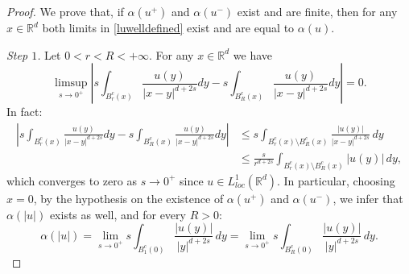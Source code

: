 \documentclass[10pt,a4paper]{amsart}
\def\R{\mathbb{R}}
\newcommand{\abs}[1]{\left|#1\right|}
\begin{document}
\begin{proof}
    We prove that, if $\alpha(u^+)$ and $\alpha(u^-)$ exist and are finite, then for any $x\in\R^d$ both limits in \ref{luwelldefined} exist and are equal to $\alpha(u)$.\par
    \textit{Step $1$.} Let $0<r<R<+\infty$. For any $x\in \R^d$ we have
    \begin{equation*}
        \limsup_{s\to 0^+} \left|s\int_{B_r^c(x)}\frac{u(y)}{\abs{x-y}^{d+2s}}dy-s\int_{B_R^c(x)}\frac{u(y)}{\abs{x-y}^{d+2s}}dy\right|=0.
    \end{equation*}
    In fact:
    \begin{equation*}
        \begin{split}
            \left|s\int_{B_r^c(x)}\frac{u(y)}{\abs{x-y}^{d+2s}}dy-s\int_{B_R^c(x)}\frac{u(y)}{\abs{x-y}^{d+2s}}dy\right|&\leq s\int_{B_r^c(x)\setminus B_R^c(x)}\frac{\abs{u(y)}}{\abs{x-y}^{d+2s}}\,dy\\
            &\leq \frac{s}{r^{d+2s}}\int_{B_r^c(x)\setminus B_R^c(x)}\abs{u(y)}\,dy,
        \end{split}
    \end{equation*}
    which converges to zero as $s\to0^+$ since $u\in L^1_{loc}(\R^d)$. In particular, choosing $x=0$, by the hypothesis on the existence of $\alpha(u^+)$ and $\alpha(u^-)$, we infer that $\alpha(|u|)$ exists as well, and for every $R>0$:
    \begin{equation}
        \label{Eq:alpha1R}
        \alpha(|u|)=\lim_{s\to0^+}{s}\int_{B_1^c(0)}\frac{|u(y)|}{\abs{y}^{d+2s}}\,dy
        =
        \lim_{s\to0^+}{s}\int_{B_R^c(0)}\frac{|u(y)|}{\abs{y}^{d+2s}}\,dy.
    \end{equation}
    

\end{proof}
\end{document}
